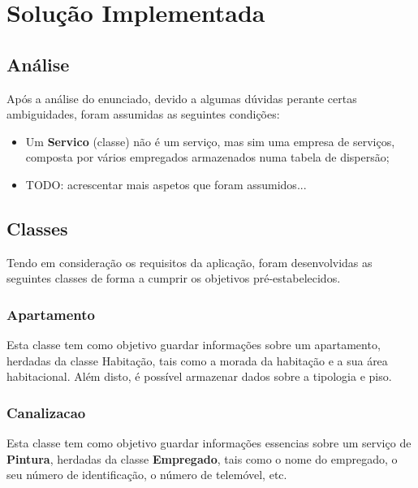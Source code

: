 \documentclass[a4paper]{article}
\begin{document}
\section{Solução Implementada}

\subsection{Análise}

Após a análise do enunciado, devido a algumas dúvidas perante certas ambiguidades, foram assumidas as seguintes condições:

\begin{itemize}

	\item Um \textbf{Servico} (classe) não é um serviço, mas sim uma empresa de serviços, composta por vários empregados armazenados numa tabela de dispersão;
	\item TODO: acrescentar mais aspetos que foram assumidos...

\end{itemize}

\subsection{Classes}

Tendo em consideração os requisitos da aplicação, foram desenvolvidas as seguintes classes de forma a cumprir os objetivos pré-estabelecidos.

\subsubsection{Apartamento}

Esta classe tem como objetivo guardar informações sobre um apartamento, herdadas da classe Habitação, tais como a morada da habitação e a sua área habitacional. Além disto, é possível armazenar dados sobre a tipologia e piso.

\subsubsection{Canalizacao}

Esta classe tem como objetivo guardar informações essencias sobre um serviço de \textbf{Pintura}, herdadas da classe \textbf{Empregado}, tais como o nome do empregado, o seu número de identificação, o número de telemóvel, etc.
\end{document}
